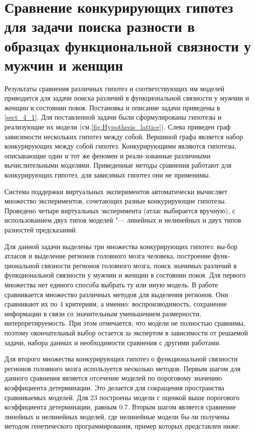\section{Сравнение конкурирующих гипотез для задачи поиска разности в 
            образцах функциональной связности у мужчин и женщин}

Результаты сравнения различных гипотез и соответствующих им моделей приводится для задачи поиска различий в 
функциональной связности у мужчин и женщин в состоянии покоя. Постановка и описание задачи приведены в 
\cref{sect_4_1}. Для поставленной задачи были сформулированы гипотезы и реализующие их 
модели (см.\cref{fig:Hypothesis_lattice}). Слева приведен граф зависимости нескольких гипотез между собой. 
Вершиной графа является набор конкурирующих между собой гипотез. Конкурирующими являются гипотезы, описывающие 
один и тот же феномен и реали-зованные различными вычислительными моделями. Приведенные методы сравнения работают 
для конкурирующих гипотез, для зависимых гипотез они не применимы.

Система поддержки виртуальных экспериментов автоматически вычисляет множество экспериментов, сочетающих разные 
конкурирующие гипотезы. Проведено четыре виртуальных эксперимента (атлас выбирается вручную), с использованием 
двух типов моделей "--- линейных и нелинейных и двух типов разностей предсказаний.

Для данной задачи выделены три множества конкурирующих гипотез: вы-бор атласов и выделение регионов головного 
мозга человека, построение функ-циональной связности регионов головного мозга, поиск значимых различий в 
функциональной связности у мужчин и женщин в состоянии покоя. Для первого множества нет единого способа выбрать 
ту или иную модель. В работе \cite{Arslan2018} сравнивается множество различных методов для выделения регионов. 
Они сравнивают их по 4 критериям, а именно: воспроизводимость, сохранение информации в связи со значительным 
уменьшением размерности, интерпретируемость. При этом отмечается, что модели не полностью сравнимы, поэтому 
окончательный выбор остается за экспертом в зависимости от решаемой задачи, набора данных и необходимости 
сравнения с другими работами. 

Для второго множества конкурирующих гипотез о функциональной связности регионов головного мозга используется несколько 
методов. Первым шагом для данного сравнения является отсечение моделей по пороговому значению коэффициента 
детерминации. Это делается для сокращения пространства сравниваемых моделей. Для 23 построены модели с оценкой 
выше порогового коэффициента детерминации, равным 0.7. Вторым шагом является сравнение линейных и нелинейных 
моделей, где нелинейные модели бы-ли получены методом генетического программирования, пример которых представлен ниже:


